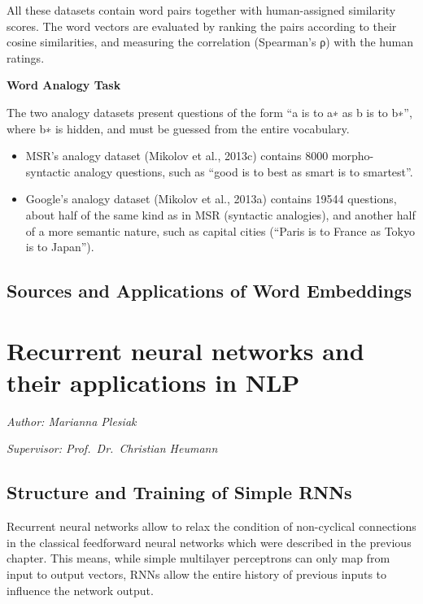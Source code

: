 \documentclass[]{krantz}
\providecommand{\tightlist}{%
  \setlength{\itemsep}{0pt}\setlength{\parskip}{0pt}}
\begin{document}
All these datasets contain word pairs together with human-assigned similarity scores. The word vectors are evaluated by ranking the pairs according to their cosine similarities, and measuring the correlation (Spearman's ρ) with the human ratings.

\textbf{Word Analogy Task}

The two analogy datasets present questions of the form ``a is to a∗ as b is to b∗'', where b∗ is hidden, and must be guessed from the entire vocabulary.

\begin{itemize}
\tightlist
\item
  MSR's analogy dataset (Mikolov et al., 2013c) contains 8000 morpho-syntactic analogy questions, such as ``good is to best as smart is to smartest''.
\item
  Google's analogy dataset (Mikolov et al., 2013a) contains 19544 questions, about half of the same kind as in MSR (syntactic analogies), and another half of a more semantic nature, such as capital cities (``Paris is to France as Tokyo is to Japan'').
\end{itemize}

\hypertarget{sources-and-applications-of-word-embeddings}{%
\section{Sources and Applications of Word Embeddings}\label{sources-and-applications-of-word-embeddings}}

\hypertarget{recurrent-neural-networks-and-their-applications-in-nlp}{%
\chapter{Recurrent neural networks and their applications in NLP}\label{recurrent-neural-networks-and-their-applications-in-nlp}}

\emph{Author: Marianna Plesiak}

\emph{Supervisor: Prof.~Dr.~Christian Heumann}

\hypertarget{structure-and-training-of-simple-rnns}{%
\section{Structure and Training of Simple RNNs}\label{structure-and-training-of-simple-rnns}}

Recurrent neural networks allow to relax the condition of non-cyclical connections in the classical feedforward neural networks which were described in the previous chapter. This means, while simple multilayer perceptrons can only map from input to output vectors, RNNs allow the entire history of previous inputs to influence the network output. \citep{graves2013generating}
\end{document}
